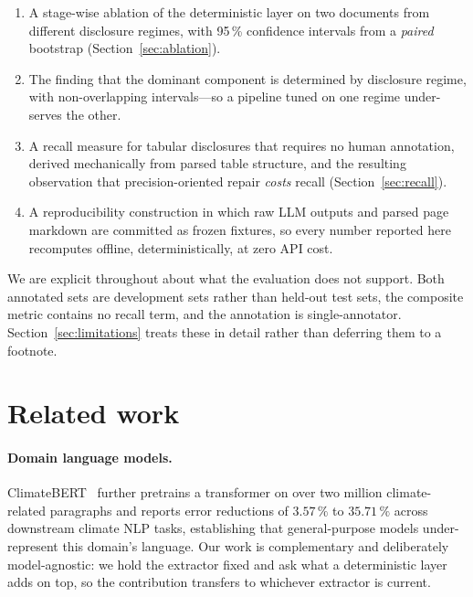 \documentclass[3p,times]{elsarticle}
\begin{document}
\begin{enumerate}
\item A stage-wise ablation of the deterministic layer on two documents from
      different disclosure regimes, with 95\,\% confidence intervals from a
      \emph{paired} bootstrap (Section~\ref{sec:ablation}).
\item The finding that the dominant component is determined by disclosure regime,
      with non-overlapping intervals---so a pipeline tuned on one regime
      under-serves the other.
\item A recall measure for tabular disclosures that requires no human
      annotation, derived mechanically from parsed table structure, and the
      resulting observation that precision-oriented repair \emph{costs} recall
      (Section~\ref{sec:recall}).
\item A reproducibility construction in which raw LLM outputs and parsed page
      markdown are committed as frozen fixtures, so every number reported here
      recomputes offline, deterministically, at zero API cost.
\end{enumerate}

We are explicit throughout about what the evaluation does not support. Both
annotated sets are development sets rather than held-out test sets, the composite
metric contains no recall term, and the annotation is single-annotator.
Section~\ref{sec:limitations} treats these in detail rather than deferring them
to a footnote.

\section{Related work}

\paragraph{Domain language models.} ClimateBERT~\cite{webersinke2021climatebert}
further pretrains a transformer on over two million climate-related paragraphs
and reports error reductions of $3.57\,\%$ to $35.71\,\%$ across downstream
climate NLP tasks, establishing that general-purpose models under-represent this
domain's language. Our work is complementary and deliberately model-agnostic: we
hold the extractor fixed and ask what a deterministic layer adds on top, so the
contribution transfers to whichever extractor is current.
\end{document}
